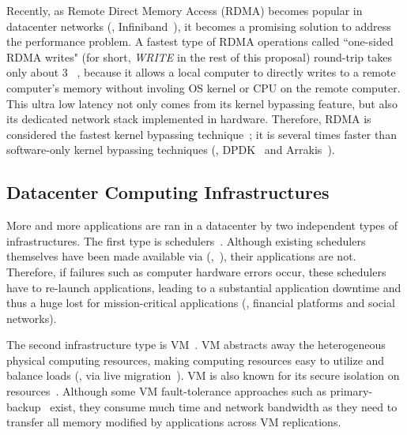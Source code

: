 Recently, as Remote Direct Memory Access (RDMA) becomes popular in datacenter 
networks (\eg, Infiniband~\cite{infiniband}), it becomes a promising solution 
to address the \paxos performance problem. A fastest type of RDMA operations 
called ``one-sided RDMA writes" (for short, \emph{WRITE} in the rest of this 
proposal) round-trip takes only about 3 \us~\cite{pilaf:usenix14}, because it 
allows a local computer to directly writes to a remote computer's memory 
without involing OS kernel or CPU on the remote computer. This ultra low latency 
not only comes from its kernel bypassing feature, but also its dedicated 
network stack implemented in hardware. Therefore, RDMA is considered the fastest 
kernel bypassing technique~\cite{herd:sigcomm14,pilaf:usenix14,dare:hpdc15}; it 
is several times faster than software-only kernel bypassing techniques (\eg, 
DPDK~\cite{dpdk} and Arrakis~\cite{arrakis:osdi14}).

\vspace{-.15in}\subsection{Datacenter Computing Infrastructures}
\label{sec:datacenter}\vspace{-.075in}

More and more applications are ran in a datacenter by two 
independent types of infrastructures. The first type is 
schedulers~\cite{borg:eurosys15,mesos:nsdi11,tupperware, yarn:socc13, 
autopilot:sosp07,quincy:sosp09,apollo:osdi14,fuxi:vldb14}. Although existing 
schedulers themselves have been made available via \paxos 
(\eg,~\cite{mesos:nsdi11}), their applications are not. Therefore, if failures 
such as computer hardware errors occur, these schedulers have to re-launch 
applications, leading to a substantial application downtime and thus a 
huge lost for mission-critical applications (\eg, financial platforms and social 
networks).

The second infrastructure type is VM~\cite{amazon:vpc, openstack, esx:osdi02, 
kvm, xen:sosp}. VM abstracts away the heterogeneous physical computing 
resources, making computing resources easy to utilize and balance loads (\eg, 
via live migration~\cite{vmotion:atc05,xen:migration:nsdi05}). VM is also known 
for its secure isolation on resources~\cite{xen:sosp,kvm,vmware:sugerman}. 
Although some VM fault-tolerance approaches such 
as primary-backup~\cite{remus:nsdi08} exist, they consume much 
time and network bandwidth as they need to transfer all memory modified by 
applications across VM replications.

